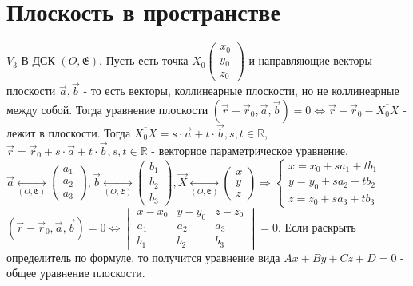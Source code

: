 \section{Плоскость в пространстве}
\(V_3\) В ДСК \((O, \mathfrak{E})\). Пусть есть точка \(X_0\begin{pmatrix}
	x_0 \\ y_0 \\ z_0
\end{pmatrix}\) и направляющие векторы плоскости \(\vec a, \vec b\) - то есть векторы, коллинеарные плоскости, но не коллинеарные между собой. Тогда уравнение плоскости \((\vec r - \vec r_0, \vec a, \vec b) = 0 \Longleftrightarrow \vec r - \vec r_0 - \overline{X_0X}\) - лежит в плоскости. Тогда \newline\(\overline{X_0X} = s\cdot\vec a + t\cdot\vec b, s, t \in \mathbb{R}\), \newline\(\vec r = \vec r_0 + s\cdot\vec a + t\cdot\vec b, s, t \in \mathbb{R}\) - векторное параметрическое уравнение. \newline
 \(\vec a \underset{(O, \mathfrak{E})}{\longleftrightarrow}\begin{pmatrix}
 	a_1 \\ a_2 \\ a_3
 \end{pmatrix},
 \vec b \underset{(O, \mathfrak{E})}{\longleftrightarrow}\begin{pmatrix}
 	b_1 \\ b_2 \\ b_3
 \end{pmatrix},
 \vec X \underset{(O, \mathfrak{E})}{\longleftrightarrow}\begin{pmatrix}
 	x \\ y \\ z
 \end{pmatrix} \Longrightarrow \left\{
 \begin{gathered}
 	x = x_0 +sa_1 + tb_1 \\
 	y = y_0 +sa_2+tb_2 \\
 	z = z_0 +sa_3+tb_3
 \end{gathered}
 \right.\)
\newline
\((\vec r - \vec r_0, \vec a, \vec b) = 0 \Longleftrightarrow \begin{vmatrix}
	x-x_0 & y-y_0 & z-z_0 \\
	a_1 & a_2 & a_3 \\
	b_1 & b_2 & b_3
\end{vmatrix} = 0.\) Если раскрыть определитель по формуле, то получится уравнение вида \(Ax+By+Cz+D = 0\) - общее уравнение плоскости.
